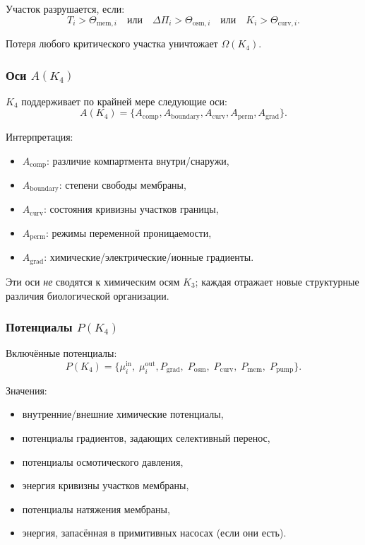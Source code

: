 Участок разрушается, если:
\[
T_i > \Theta_{\mathrm{mem},i}
\quad \text{или} \quad
\Delta \Pi_i > \Theta_{\mathrm{osm},i}
\quad \text{или} \quad
K_i > \Theta_{\mathrm{curv},i}.
\]

Потеря любого критического участка уничтожает $\Omega(K_4)$.

\subsubsection{Оси \texorpdfstring{$A(K_4)$}{A(K_4)}}

$K_4$ поддерживает по крайней мере следующие оси:
\[
A(K_4) = \{ A_{\mathrm{comp}}, A_{\mathrm{boundary}},
           A_{\mathrm{curv}}, A_{\mathrm{perm}}, A_{\mathrm{grad}}\}.
\]

Интерпретация:
\begin{itemize}
    \item $A_{\mathrm{comp}}$: различие компартмента внутри/снаружи,
    \item $A_{\mathrm{boundary}}$: степени свободы мембраны,
    \item $A_{\mathrm{curv}}$: состояния кривизны участков границы,
    \item $A_{\mathrm{perm}}$: режимы переменной проницаемости,
    \item $A_{\mathrm{grad}}$: химические/электрические/ионные градиенты.
\end{itemize}

Эти оси \emph{не} сводятся к химическим осям $K_3$; каждая
отражает новые структурные различия биологической организации.

\subsubsection{Потенциалы \texorpdfstring{$P(K_4)$}{P(K_4)}}

Включённые потенциалы:
\[
P(K_4) =
\{ \mu_i^{\mathrm{in}},\; \mu_i^{\mathrm{out}},
   P_{\mathrm{grad}},\;
   P_{\mathrm{osm}},\;
   P_{\mathrm{curv}},\;
   P_{\mathrm{mem}},\;
   P_{\mathrm{pump}} \}.
\]

Значения:
\begin{itemize}
    \item внутренние/внешние химические потенциалы,
    \item потенциалы градиентов, задающих селективный перенос,
    \item потенциалы осмотического давления,
    \item энергия кривизны участков мембраны,
    \item потенциалы натяжения мембраны,
    \item энергия, запасённая в примитивных насосах (если они есть).
\end{itemize}

